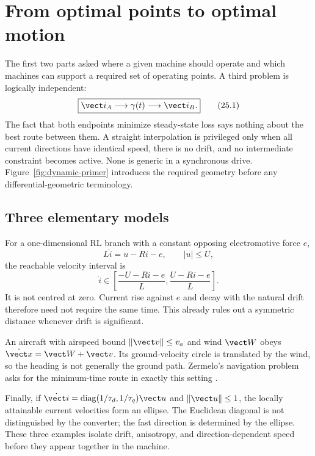\section{From optimal points to optimal motion}
\label{sec:dynamic-question}

The first two parts asked where a given machine should operate and which
machines can support a required set of operating points.  A third problem is
logically independent:
\[
 \boxed{\vect i_A\longrightarrow\gamma(t)\longrightarrow\vect i_B.}
 \tag{25.1}
\]
The fact that both endpoints minimize steady-state loss says nothing about the
best route between them.  A straight interpolation is privileged only when
all current directions have identical speed, there is no drift, and no
intermediate constraint becomes active.  None is generic in a synchronous
drive.  Figure~\ref{fig:dynamic-primer} introduces the required geometry
before any differential-geometric terminology.



\subsection{Three elementary models}

For a one-dimensional RL branch with a constant opposing electromotive force
\(e\),
\[
 L\dot i=u-Ri-e,\qquad |u|\leq U,
 \tag{25.2}
\]
the reachable velocity interval is
\[
 \dot i\in\left[\frac{-U-Ri-e}{L},\frac{U-Ri-e}{L}\right].
 \tag{25.3}
\]
It is not centred at zero.  Current rise against \(e\) and decay with the
natural drift therefore need not require the same time.  This already rules
out a symmetric distance whenever drift is significant.

An aircraft with airspeed bound \(\|\vect v\|\leq v_a\) and wind
\(\vect W\) obeys \(\dot{\vect x}=\vect W+\vect v\).  Its ground-velocity
circle is translated by the wind, so the heading is not generally the ground
path.  Zermelo's navigation problem asks for the minimum-time route in exactly
this setting \parencite{zermelo1931,bao2004}.

Finally, if \(\dot{\vect i}=\operatorname{diag}(1/\tau_d,1/\tau_q)\vect u\)
and \(\|\vect u\|\leq1\), the locally attainable current velocities form an
ellipse.  The Euclidean diagonal is not distinguished by the converter; the
fast direction is determined by the ellipse.  These three examples isolate
drift, anisotropy, and direction-dependent speed before they appear together
in the machine.

